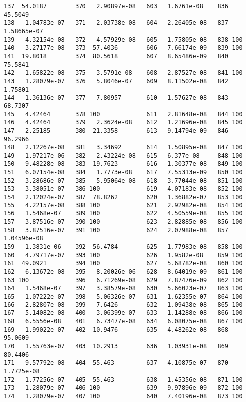\documentclass{article}
\begin{document}
\begin{verbatim}
137  54.0187        370   2.90897e-08   603   1.6761e-08    836  45.5049
138   1.04783e-07   371   2.03738e-08   604   2.26405e-08   837   1.58665e-07
139   4.32154e-08   372   4.57929e-08   605   1.75805e-08   838 100
140   3.27177e-08   373  57.4036        606   7.66174e-09   839 100
141  19.8018        374  80.5618        607   8.65486e-09   840  75.5841
142   1.65822e-08   375   3.5791e-08    608   2.87527e-08   841 100
143   1.28079e-07   376   5.8046e-07    609   8.11502e-08   842   1.75801
144   1.36136e-07   377   7.80957       610   1.57627e-08   843  68.7307
145   4.42464       378 100             611   2.81648e-08   844 100
146   4.42464       379   2.3624e-08    612   1.21696e-08   845 100
147   2.25185       380  21.3358        613   9.14794e-09   846  96.2966
148   2.12267e-08   381   3.34692       614   1.50895e-08   847 100
149   1.97217e-06   382   2.43224e-08   615   6.377e-08     848 100
150   9.48228e-08   383  19.7623        616   1.30377e-08   849 100
151   6.07154e-08   384   1.7773e-08    617   7.55313e-09   850 100
152   3.28686e-07   385   5.95064e-08   618   3.77044e-08   851 100
153   3.38051e-07   386 100             619   4.07183e-08   852 100
154   2.12024e-07   387  78.8262        620   1.36882e-07   853 100
155   4.22157e-08   388 100             621   2.92982e-08   854 100
156   1.5468e-07    389 100             622   4.50559e-08   855 100
157   3.87516e-07   390 100             623   2.82885e-08   856 100
158   3.87516e-07   391 100             624   2.07988e-08   857   1.04596e-08
159   1.3831e-06    392  56.4784        625   1.77983e-08   858 100
160   4.79717e-07   393 100             626   1.9582e-08    859 100
161  49.0921        394 100             627   5.68782e-08   860 100
162   6.13672e-08   395   8.20026e-06   628   8.64019e-09   861 100
163 100             396   6.71269e-08   629   7.87476e-09   862 100
164   1.5468e-07    397   3.38579e-08   630   5.66023e-07   863 100
165   1.07222e-07   398   5.06326e-07   631   1.62355e-07   864 100
166   2.82807e-08   399   7.6426        632   1.09438e-08   865 100
167   5.14082e-08   400   3.06399e-07   633   1.14288e-08   866 100
168   6.5556e-08    401   6.73477e-08   634   6.08075e-08   867 100
169   1.99022e-07   402  10.9476        635   4.48262e-08   868  95.0609
170   1.55763e-07   403  10.2913        636   1.03931e-08   869  80.4406
171   9.57792e-08   404  55.463         637   4.10875e-07   870   1.7725e-08
172   1.77256e-07   405  55.463         638   1.45356e-08   871 100
173   1.28079e-07   406 100             639   9.97896e-09   872 100
174   1.28079e-07   407 100             640   7.40196e-08   873 100

\end{verbatim}
\end{document}
